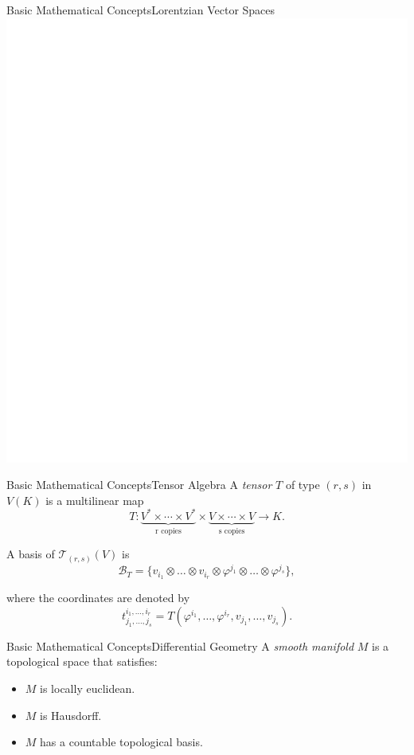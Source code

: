 \begin{frame}{Basic Mathematical Concepts}{Lorentzian Vector Spaces}
	\centering
	\includegraphics[height=0.7\paperheight]{gfx/timecones}
\end{frame}

\begin{frame}{Basic Mathematical Concepts}{Tensor Algebra}
	A \emph{tensor} $T$ of type $(r, s)$ in $V(K)$ is a multilinear map
	\[
		T \colon \underbrace{V^* \times \cdots \times V^*}_{\text{r copies}} \times \underbrace{V \times \cdots \times V}_{\text{s copies}} \longrightarrow K.
	\]
	
	\pause
	
	A basis of $\mathcal{T}_{(r,s)}(V)$ is
	\[
		\mathcal{B}_T = \{v_{i_1} \otimes \dots \otimes v_{i_r} \otimes \varphi^{j_1} \otimes \dots \otimes \varphi^{j_s}\},
	\]
	
	\pause
	where the coordinates are denoted by \[t^{i_1,\dots,i_r}_{j_1,\dots,j_s} = T(\varphi^{i_1}, \dots, \varphi^{i_r}, v_{j_1}, \dots, v_{j_s}).\]
\end{frame}

\begin{frame}{Basic Mathematical Concepts}{Differential Geometry}
	A \emph{smooth manifold} $M$ is a topological space that satisfies:
	\begin{itemize}
		\item $M$ is locally euclidean.
		\pause
		\item $M$ is Hausdorff.
		\pause
		\item $M$ has a countable topological basis.
	\end{itemize}
\end{frame}

